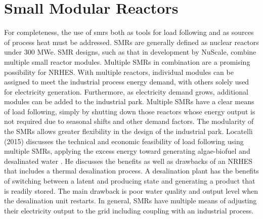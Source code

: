 \documentclass[12pt]{UIdahoMastersThesis}
\begin{document}
\section{Small Modular Reactors}
For completeness, the use of \ac{smrs} both as tools for load following and as sources of process heat must be addressed. SMRs are generally defined as nuclear reactors under 300 MWe. SMR designs, such as that in development by NuScale, combine multiple small reactor modules. Multiple SMRs in combination are a promising possibility for NRHES.  With multiple reactors, individual modules can be assigned to meet the industrial process energy demand, with others solely used for electricity generation. Furthermore, as electricity demand grows, additional modules can be added to the industrial park. Multiple SMRs have a clear means of load following, simply by shutting down those reactors whose energy output is not required due to seasonal shifts and other demand factors. The modularity of the SMRs allows greater flexibility in the design of the industrial park.  Locatelli (2015) discusses the technical and economic feasibility of load following using multiple SMRs, applying the excess energy toward generating algae-biofuel and desalinated water \cite{Locatelli2015}. He discusses the benefits as well as drawbacks of an NRHES that includes a thermal desalination process. A desalination plant has the benefits of switching between a latent and producing state and generating a product that is readily stored. The main drawback is poor water quality and output level when the desalination unit restarts. In general, SMRs have multiple means of adjusting their electricity output to the grid including coupling with an industrial process.
\end{document}
